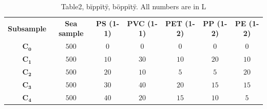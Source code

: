 \documentclass[twocolumn,a4paper,aps,amsmath,amssymb,floatfix,superscriptaddress]{revtex4-2}
\begin{document}
	\begin{table}
		\centering
		\begin{threeparttable}
			\caption[table]{Table2, bïppïtÿ, böppïtÿ. All numbers are in \mu L}
			\label{tab:Table2}
			\begin{tabular}{c||c|c|c|c|c|c}
				\textbf{Subsample} & \textbf{Sea sample } & \textbf{PS (1-1)} & \textbf{PVC (1-1)} & \textbf{PET (1-2)} & \textbf{PP (1-2)} & \textbf{PE (1-2)} \\
				\hhline{=======}
				 $\mathbf{C_0}$ & $500$ & $0$ & $0$ & $0$& $0$ & $0$ \\
				\hline
				  $\mathbf{C_1}$ & $500$ & $10$ & $30$ & $10$ & $20$ & $10$ \\
				\hline
				 $\mathbf{C_2}$ & $500$ & $20$ & $10$ & $5$ & $5$ & $20$ \\
				\hline
				 $\mathbf{C_3}$ & $500$ & $30$ & $40$ & $20$ & $15$ & $15$ \\
				\hline
				 $\mathbf{C_4}$ & $500$ & $40$ & $20$ & $15$ & $10$ & $5$ \\			
			\end{tabular}
		\end{threeparttable}
	\end{table}
	
\end{document}

